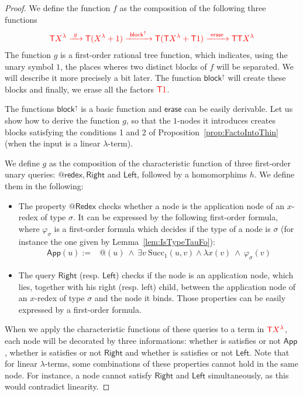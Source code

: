 \begin{proof}
We define the function $f$ as the composition of the following three functions
\begin{align*}
{\color{red}{{\color{red}{\mathsf T}}{\color{red}{X^\lambda}} \xrightarrow{\ g\ } {\color{red}{\mathsf T}}({\color{red}{X^\lambda}}+1) \xrightarrow{\ \mathsf{block}^\uparrow\ } {\color{red}{\mathsf T}}({\color{red}{\mathsf T}}{\color{red}{X^\lambda}}+{\color{red}{\mathsf T}}1)
\xrightarrow{\ \mathsf{erase}\ } {\color{red}{\mathsf T}}{\color{red}{\mathsf T}}{\color{red}{X^\lambda}}}}
\end{align*}
The function $g$ is a first-order rational tree function, which indicates, using the unary symbol $1$, the places wheres two distinct blocks of $f$ will be separated. We will describe it more precisely a bit later. The function $\mathsf{block}^\uparrow$ will create these blocks and finally, we erase all the factors ${\color{red}{{\color{red}{\mathsf T}}1}}$.

The functions $\mathsf{block}^\uparrow$ is a basic function and  $\mathsf{erase}$ can be easily derivable. 
Let us show how to derive the function $g$, so that the $1$-nodes it introduces creates blocks satisfying the conditions 1 and 2 of Proposition~\ref{prop:FactoIntoThin} (when the input is a linear $\lambda$-term).  

We define $g$ as the composition of the characteristic function of three first-order unary queries: $\mathsf{@redex}, \mathsf{Right}$ and $\mathsf{Left}$, followed by a homomorphims $h$. We define them in the following:
\begin{itemize}
\item The property $\mathsf{@Redex}$ checks whether a node is the application node of an $x$-redex of type $\sigma$. It can be expressed by the following first-order formula, where  $\varphi_\sigma$ is a first-order formula which decides if the type of a node is $\sigma$ (for instance the one given by Lemma~\ref{lem:IsTypeTauFo}):
\begin{align*} \mathsf{App}( u ):=& \mathsf{@}(u)\ \wedge\ \exists v\  \mathrm{Succ}_1(u, v) \wedge \lambda x(v)\ \wedge\ \varphi_\sigma(v)
\end{align*} 
\item The query $\mathsf{Right}$ (resp. $\mathsf{Left}$) checks if the node is an application node, which lies, together with his right (resp. left) child, between the application node of an $x$-redex of type $\sigma$ and the node it binds. Those properties can be easily expressed by a first-order formula.
\end{itemize}

When we apply the characteristic functions of these queries to a term in ${\color{red}{{\color{red}{\mathsf T}}X^\lambda}}$, each node will be decorated by three informations: whether is satisfies or not $\mathsf{App}$,  whether is satisfies or not $\mathsf{Right}$ and whether is satisfies or not $\mathsf{Left}$. Note that for linear $\lambda$-terms, some combinations of these properties cannot hold in the same node. For instance, a node cannot satisfy $\mathsf{Right}$ and $\mathsf{Left}$ simultaneously, as this would contradict linearity. 


\end{proof}
